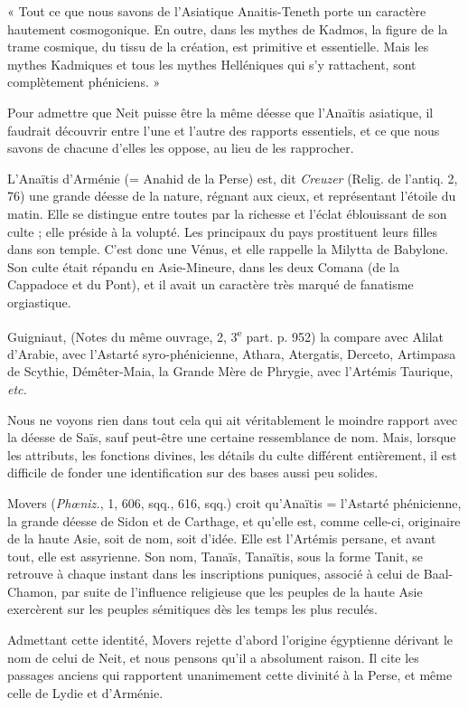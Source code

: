 \documentclass[a4paper, 11pt, oneside]{article}
\begin{document}
« Tout ce que nous savons de l'Asiatique Anaitis-Teneth porte un caractère hautement cosmogonique. En outre, dans les mythes de Kadmos, la figure de la trame cosmique, du tissu de la création, est primitive et essentielle. Mais les mythes Kadmiques et tous les mythes Helléniques qui s'y rattachent, sont complètement phéniciens. »

Pour admettre que Neit puisse être la même déesse que l'Anaïtis asiatique, il faudrait découvrir entre l'une et l'autre des rapports essentiels, et ce que nous savons de chacune d'elles les oppose, au lieu de les rapprocher.

L'Anaïtis d'Arménie (= Anahid de la Perse) est, dit \emph{Creuzer} (Relig. de l'antiq. 2, 76) une grande déesse de la nature, régnant aux cieux, et représentant l'étoile du matin. Elle se distingue entre toutes par la richesse et l'éclat éblouissant de son culte ; elle préside à la volupté. Les principaux du pays prostituent leurs filles dans son temple. C'est donc une Vénus, et elle rappelle la Milytta de Babylone. Son culte était répandu en Asie-Mineure, dans les deux Comana (de la Cappadoce et du Pont), et il avait un caractère très marqué de fanatisme orgiastique.

Guigniaut, (Notes du même ouvrage, 2, 3\textsuperscript{e} part. p. 952) la compare avec Alilat d'Arabie, avec l'Astarté syro-phénicienne, Athara, Atergatis, Derceto, Artimpasa de Scythie, Démêter-Maia, la Grande Mère de Phrygie, avec l'Artémis Taurique, \emph{etc.}

Nous ne voyons rien dans tout cela qui ait véritablement le moindre rapport avec la déesse de Saïs, sauf peut-être une certaine ressemblance de nom. Mais, lorsque les attributs, les fonctions divines, les détails du culte différent entièrement, il est difficile de fonder une identification sur des bases aussi peu solides.

Movers (\emph{Phœniz.}, 1, 606, sqq., 616, sqq.) croit qu'Anaïtis = l'Astarté phénicienne, la grande déesse de Sidon et de Carthage, et qu'elle est, comme celle-ci, originaire de la haute Asie, soit de nom, soit d'idée. Elle est l'Artémis persane, et avant tout, elle est assyrienne. Son nom, Tanaïs, Tanaïtis, sous la forme Tanit, se retrouve à chaque instant dans les inscriptions puniques, associé à celui de Baal-Chamon, par suite de l'influence religieuse que les peuples de la haute Asie exercèrent sur les peuples sémitiques dès les temps les plus reculés.

Admettant cette identité, Movers rejette d'abord l'origine égyptienne dérivant le nom de celui de Neit, et nous pensons qu'il a absolument raison. Il cite les passages anciens qui rapportent unanimement cette divinité à la Perse, et même celle de Lydie et d'Arménie.
\end{document}
